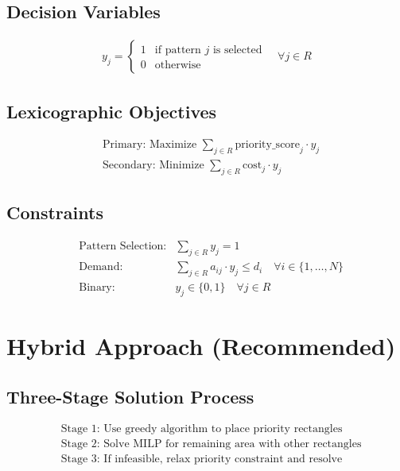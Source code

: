 \documentclass{article}
\begin{document}
\subsection{Decision Variables}
\begin{align*}
y_j = 
\begin{cases}
1 & \text{if pattern } j \text{ is selected} \\
0 & \text{otherwise}
\end{cases}
\quad \forall j \in R
\end{align*}

\subsection{Lexicographic Objectives}
\begin{align*}
&\text{Primary: Maximize } \sum_{j \in R} \text{priority\_score}_j \cdot y_j \\
&\text{Secondary: Minimize } \sum_{j \in R} \text{cost}_j \cdot y_j
\end{align*}

\subsection{Constraints}
\begin{align}
&\text{Pattern Selection:} & \sum_{j \in R} y_j = 1 \\
&\text{Demand:} & \sum_{j \in R} a_{ij} \cdot y_j \leq d_i \quad \forall i \in \{1, \ldots, N\} \\
&\text{Binary:} & y_j \in \{0,1\} \quad \forall j \in R
\end{align}

\section{Hybrid Approach (Recommended)}

\subsection{Three-Stage Solution Process}
\begin{align*}
&\text{Stage 1: Use greedy algorithm to place priority rectangles} \\
&\text{Stage 2: Solve MILP for remaining area with other rectangles} \\
&\text{Stage 3: If infeasible, relax priority constraint and resolve}
\end{align*}
\end{document}
